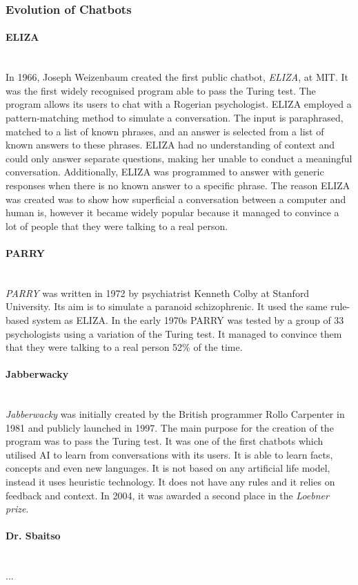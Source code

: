 \documentclass[12pt,a4paper]{article}
\newcommand{\myparagraph}[1]{\paragraph{#1}\mbox{}\\}
\begin{document}
\subsubsection{Evolution of Chatbots}
\myparagraph{ELIZA}
In 1966, Joseph Weizenbaum created the first public chatbot, \textit{ELIZA}, at MIT. It was the first widely recognised program able to pass the Turing test. The program allows its users to chat with a Rogerian psychologist. ELIZA employed a pattern-matching method to simulate a conversation. The input is paraphrased, matched to a list of known phrases, and an answer is selected from a list of known answers to these phrases. ELIZA had no understanding of context and could only answer separate questions, making her unable to conduct a meaningful conversation. Additionally, ELIZA was programmed to answer with generic responses when there is no known answer to a specific phrase.
The reason ELIZA was created was to show how superficial a conversation between a computer and human is, however it became widely popular because it managed to convince a lot of people that they were talking to a real person.

\myparagraph{PARRY}
\textit{PARRY} was written in 1972 by psychiatrist Kenneth Colby at Stanford University. Its aim is to simulate a paranoid schizophrenic. It used the same rule-based system as ELIZA. In the early 1970s PARRY was tested by a group of 33 psychologists using a variation of the Turing test. It managed to convince them that they were talking to a real person 52\% of the time.

\myparagraph{Jabberwacky}
\textit{Jabberwacky} was initially created by the British programmer Rollo Carpenter in 1981 and publicly launched in 1997. The main purpose for the creation of the program was to pass the Turing test. It was one of the first chatbots which utilised AI to learn from conversations with its users. It is able to learn facts, concepts and even new languages. It is not based on any artificial life model, instead it uses heuristic technology. It does not have any rules and it relies on feedback and context. In 2004, it was awarded a second place in the \textit{Loebner prize}.

\myparagraph{Dr. Sbaitso}
...
\end{document}
